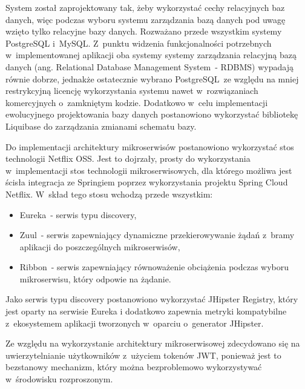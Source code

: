 \par
System został zaprojektowany tak, żeby wykorzystać cechy relacyjnych baz danych,
więc podczas wyboru systemu zarządzania bazą danych pod uwagę wzięto tylko relacyjne bazy danych.
Rozważano przede wszystkim systemy PostgreSQL\cite{tech:postgresql} i~MySQL\cite{tech:mysql}.
Z~punktu widzenia funkcjonalności potrzebnych w~implementowanej aplikacji oba systemy systemy zarządzania relacyjną bazą danych (ang. Relational Database Management System~- RDBMS) wypadają równie dobrze,
jednakże ostatecznie wybrano PostgreSQL~ze względu na mniej restrykcyjną licencję wykorzystania systemu nawet w~rozwiązaniach komercyjnych o~zamkniętym kodzie.
Dodatkowo w~celu implementacji ewolucyjnego projektowania bazy danych\cite{url:evolutionary-database} postanowiono wykorzystać bibliotekę Liquibase\cite{tech:liquibase} do zarządzania zmianami schematu bazy.

\par
Do implementacji architektury mikroserwisów postanowiono wykorzystać stos technologii Netflix OSS\cite{tech:netflix-oss}.
Jest to dojrzały, prosty do wykorzystania w~implementacji stos technologii mikroserwisowych,
dla którego możliwa jest ścisła integracja ze Springiem poprzez wykorzystania projektu Spring Cloud Netflix\cite{tech:spring-cloud-netflix}.
W~skład tego stosu wchodzą przede wszystkim:
\begin{itemize}
    \item Eureka\cite{tech:netflix-eureka}~- serwis typu discovery,
    \item Zuul\cite{tech:netflix-zuul}~- serwis zapewniający dynamiczne przekierowywanie żądań z~bramy aplikacji do poszczególnych mikroserwisów,
    \item Ribbon\cite{tech:netflix-ribbon}~- serwis zapewniający równoważenie obciążenia podczas wyboru mikroserwisu, który odpowie na żądanie.
\end{itemize}

\par
Jako serwis typu discovery postanowiono wykorzystać JHipster Registry\cite{tech:jhipster-registry}, który jest oparty na serwisie Eureka
i dodatkowo zapewnia metryki kompatybilne z~ekosystemem aplikacji tworzonych w~oparciu o~generator JHipster.

\par
Ze względu na wykorzystanie architektury mikroserwisowej zdecydowano się na uwierzytelnianie użytkowników z~użyciem tokenów JWT\cite{url:jwt},
ponieważ jest to bezstanowy mechanizm, który można bezproblemowo wykorzystywać w~środowisku rozproszonym.

